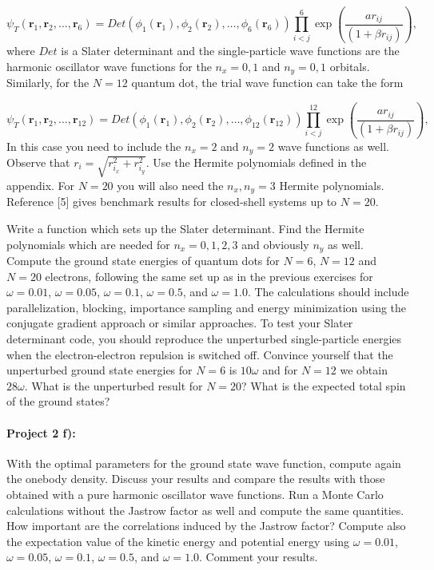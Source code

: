 \documentclass[%
oneside,                 %
final,                   %
10pt]{article}
\begin{document}
\begin{equation}
   \psi_{T}(\bm{r}_1,\bm{r}_2,\dots, \bm{r}_6) = 
   Det\left(\phi_{1}(\bm{r}_1),\phi_{2}(\bm{r}_2),
   \dots,\phi_{6}(\bm{r}_6)\right)
   \prod_{i<j}^{6}\exp{\left(\frac{a r_{ij}}{(1+\beta r_{ij})}\right)}, 
\end{equation}
where $Det$ is a Slater determinant and the single-particle wave functions
are the harmonic oscillator wave functions for the $n_x=0,1$ and $n_y=0,1$ orbitals. 
Similarly, for the $N=12$ quantum dot, the trial wave function can take the form

\begin{equation}
   \psi_{T}(\bm{r}_1,\bm{r}_2, \dots,\bm{r}_{12}) = 
   Det\left(\phi_{1}(\bm{r}_1),\phi_{2}(\bm{r}_2),
   \dots,\phi_{12}(\bm{r}_{12})\right)
   \prod_{i<j}^{12}\exp{\left(\frac{ar_{ij}}{(1+\beta r_{ij})}\right)}, 
\end{equation}
In this case you need to include the $n_x=2$ and $n_y=2$ wave functions as well.
Observe that $r_i = \sqrt{r_{i_x}^2+r_{i_y}^2}$.  Use the Hermite polynomials defined in the appendix.
For $N=20$ you will also need the $n_x,n_y=3$ Hermite polynomials.  Reference [5] gives benchmark results for closed-shell systems up to $N=20$. 


Write a function which sets up the Slater determinant. Find the Hermite polynomials which are needed for $n_x=0,1,2,3$ and obviously $n_y$ as well.
Compute the ground state energies of quantum dots for $N=6$, $N=12$ and $N=20$ electrons, following the same set up as in the previous exercises for $\omega=0.01$, $\omega=0.05$,
$\omega=0.1$, $\omega=0.5$, and $\omega=1.0$.
The calculations should include  parallelization, blocking, importance sampling and energy minimization using the conjugate gradient approach or similar approaches.
To test your Slater determinant code, you should reproduce the unperturbed single-particle energies
when the electron-electron repulsion is switched off. Convince yourself that the unperturbed ground state energies for $N=6$ is $10\omega$ and for $N=12$ we obtain $28\omega$.  What is the unperturbed result for $N=20$? What is the expected total 
spin of the ground states?

\paragraph{Project 2 f):}
With the optimal parameters for the ground state wave function, compute again the onebody density. Discuss your results and compare the results with those obtained with a pure harmonic oscillator
wave functions. Run a Monte Carlo calculations without the Jastrow factor as well
and compute the same quantities. How important are the correlations induced by the Jastrow factor?
Compute also the expectation value of the kinetic energy and potential energy using $\omega=0.01$,
$\omega=0.05$, $\omega=0.1$, $\omega=0.5$, and $\omega=1.0$. Comment your results.
\end{document}
